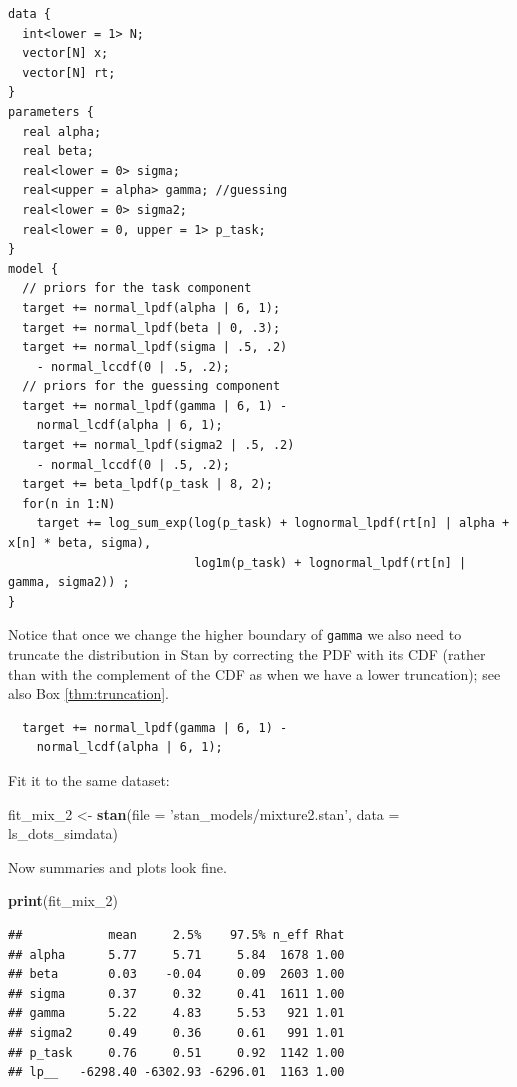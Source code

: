 \documentclass[12pt,]{krantz}
\newenvironment{Shaded}{\begin{snugshade}}{\end{snugshade}}
\newcommand{\DataTypeTok}[1]{\textcolor[rgb]{0.13,0.29,0.53}{#1}}
\newcommand{\DecValTok}[1]{\textcolor[rgb]{0.00,0.00,0.81}{#1}}
\newcommand{\KeywordTok}[1]{\textcolor[rgb]{0.13,0.29,0.53}{\textbf{#1}}}
\newcommand{\NormalTok}[1]{#1}
\newcommand{\StringTok}[1]{\textcolor[rgb]{0.31,0.60,0.02}{#1}}
\theoremstyle{definition}
\theoremstyle{definition}
\theoremstyle{definition}
\theoremstyle{remark}
\begin{document}
\begin{verbatim}
data {
  int<lower = 1> N;
  vector[N] x;
  vector[N] rt;
}
parameters {
  real alpha;
  real beta;
  real<lower = 0> sigma;
  real<upper = alpha> gamma; //guessing
  real<lower = 0> sigma2;
  real<lower = 0, upper = 1> p_task;
}
model {
  // priors for the task component
  target += normal_lpdf(alpha | 6, 1);
  target += normal_lpdf(beta | 0, .3);
  target += normal_lpdf(sigma | .5, .2)
    - normal_lccdf(0 | .5, .2);
  // priors for the guessing component
  target += normal_lpdf(gamma | 6, 1) -
    normal_lcdf(alpha | 6, 1);
  target += normal_lpdf(sigma2 | .5, .2)
    - normal_lccdf(0 | .5, .2);
  target += beta_lpdf(p_task | 8, 2);
  for(n in 1:N)
    target += log_sum_exp(log(p_task) + lognormal_lpdf(rt[n] | alpha + x[n] * beta, sigma),
                          log1m(p_task) + lognormal_lpdf(rt[n] | gamma, sigma2)) ;
}
\end{verbatim}

Notice that once we change the higher boundary of \texttt{gamma} we also need to truncate the distribution in Stan by correcting the PDF with its CDF (rather than with the complement of the CDF as when we have a lower truncation); see also Box \ref{thm:truncation}.

\begin{verbatim}
  target += normal_lpdf(gamma | 6, 1) -
    normal_lcdf(alpha | 6, 1);
\end{verbatim}

Fit it to the same dataset:

\begin{Shaded}
\begin{Highlighting}[]
\NormalTok{fit_mix_}\DecValTok{2}\NormalTok{ <-}\StringTok{ }\KeywordTok{stan}\NormalTok{(}\DataTypeTok{file =} \StringTok{'stan_models/mixture2.stan'}\NormalTok{, }
               \DataTypeTok{data =}\NormalTok{ ls_dots_simdata)  }
\end{Highlighting}
\end{Shaded}

Now summaries and plots look fine.

\begin{Shaded}
\begin{Highlighting}[]
\KeywordTok{print}\NormalTok{(fit_mix_}\DecValTok{2}\NormalTok{) }
\end{Highlighting}
\end{Shaded}

\begin{verbatim}
##            mean     2.5%    97.5% n_eff Rhat
## alpha      5.77     5.71     5.84  1678 1.00
## beta       0.03    -0.04     0.09  2603 1.00
## sigma      0.37     0.32     0.41  1611 1.00
## gamma      5.22     4.83     5.53   921 1.01
## sigma2     0.49     0.36     0.61   991 1.01
## p_task     0.76     0.51     0.92  1142 1.00
## lp__   -6298.40 -6302.93 -6296.01  1163 1.00
\end{verbatim}
\end{document}
